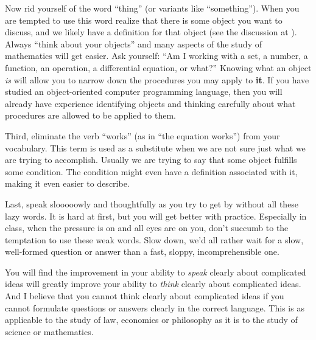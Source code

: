 %
\begin{para}Now rid yourself of the word ``thing'' (or variants like ``something'').  When you are tempted to use this word realize that there is some object you want to discuss, and we likely have a definition for that object (see the discussion at ).  Always ``think about your objects'' and many aspects of the study of mathematics will get easier.  Ask yourself: ``Am I working with a set, a number, a function, an operation, a differential equation, or what?''  Knowing what an object {\em is} will allow you to narrow down the procedures you may apply to {\bf it}.  If you have studied an object-oriented computer programming language, then you will already have experience identifying objects and thinking carefully about what procedures are allowed to be applied to them.\end{para}
%
\begin{para}Third, eliminate the verb ``works'' (as in ``the equation works'') from your vocabulary.  This term is used as a substitute when we are not sure just what we are trying to accomplish.  Usually we are trying to say that some object fulfills some condition.  The condition might even have a definition associated with it, making it even easier to describe.\end{para}
%
\begin{para}Last, speak slooooowly and thoughtfully as you try to get by without all these lazy words.  It is hard at first, but you will get better with practice.  Especially in class, when the pressure is on and all eyes are on you, don't succumb to the temptation to use these weak words.  Slow down, we'd all rather wait for a slow, well-formed question or answer than a fast, sloppy, incomprehensible one.\end{para}
%
\begin{para}You will find the improvement in your ability to {\em speak} clearly about complicated ideas will greatly improve your ability to {\em think}  clearly about complicated ideas.  And I believe that you cannot think clearly about complicated ideas if you cannot formulate questions or answers clearly in the correct language.  This is as applicable to the study of law, economics or philosophy as it is to the study of science or mathematics.\end{para}
%
